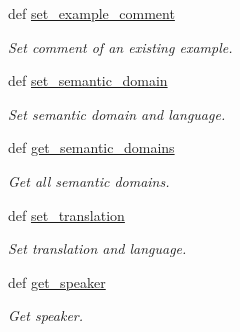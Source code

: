 \begin{DoxyCompactItemize}
def \hyperlink{classlmf_1_1src_1_1core_1_1lexical__entry_1_1_lexical_entry_a492011efb0c5c4dbe7312d3f4d7f8b5e}{set\+\_\+example\+\_\+comment}
\begin{DoxyCompactList}\small\item\em Set comment of an existing example. \end{DoxyCompactList}\item 
def \hyperlink{classlmf_1_1src_1_1core_1_1lexical__entry_1_1_lexical_entry_a215b437f217ce3e652380f74059403e1}{set\+\_\+semantic\+\_\+domain}
\begin{DoxyCompactList}\small\item\em Set semantic domain and language. \end{DoxyCompactList}\item 
def \hyperlink{classlmf_1_1src_1_1core_1_1lexical__entry_1_1_lexical_entry_afd064ec67db5c093665165b59162f94f}{get\+\_\+semantic\+\_\+domains}
\begin{DoxyCompactList}\small\item\em Get all semantic domains. \end{DoxyCompactList}\item 
def \hyperlink{classlmf_1_1src_1_1core_1_1lexical__entry_1_1_lexical_entry_a8b90d3fd26d1c8f54f36810ca63e156a}{set\+\_\+translation}
\begin{DoxyCompactList}\small\item\em Set translation and language. \end{DoxyCompactList}\item 
def \hyperlink{classlmf_1_1src_1_1core_1_1lexical__entry_1_1_lexical_entry_ac741ce07b961fb9d6d0a1033cf1f1790}{get\+\_\+speaker}
\begin{DoxyCompactList}\small\item\em Get speaker. \end{DoxyCompactList}\end{DoxyCompactItemize}
